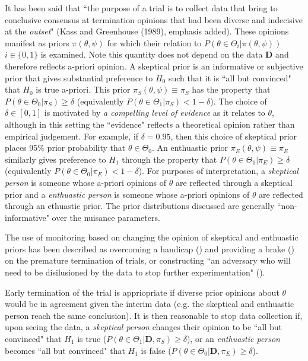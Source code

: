 \documentclass[12pt]{article}
\begin{document}
It has been said that ``the purpose of a trial is to collect data that bring to conclusive consensus at termination opinions that had been diverse and indecisive at the \textit{outset}" (Kass and Greenhouse (1989), emphasis added). These opinions manifest as priors $\pi(\theta,\psi)$ for which their relation to $P(\theta\in\Theta_i|\pi(\theta,\psi))$ $i\in\{0,1\}$ is examined. Note this quantity does not depend on the data $\mathbf{D}$ and therefore reflects a-priori opinion. A skeptical prior is an informative or subjective prior that gives substantial preference to $H_0$ such that it is ``all but convinced" that $H_0$ is true a-priori. This prior $\pi_{S}(\theta,\psi)\equiv\pi_{S}$ has the property that $P(\theta\in\Theta_0| \pi_{S})\geq\delta$ (equivalently $P(\theta\in\Theta_1| \pi_{S})<1-\delta$). The choice of $\delta\in[0,1]$ is motivated by \textit{a compelling level of evidence} as it relates to $\theta$, although in this setting the ``evidence" reflects a theoretical opinion rather than empirical judgement. For example, if $\delta=0.95$, then this choice of skeptical prior places 95\% prior probability that $\theta\in\Theta_0$. An enthuastic prior $\pi_{E}(\theta,\psi)\equiv\pi_{E}$ similarly gives preference to $H_1$ through the property that $P(\theta\in\Theta_1| \pi_{E})\geq\delta$ (equivalently $P(\theta\in\Theta_0| \pi_{E})<1-\delta$). For purposes of interpretation, a \textit{skeptical person} is someone whose a-priori opinions of $\theta$ are reflected through a skeptical prior and a \textit{enthuastic person} is someone whose a-priori opinions of $\theta$ are reflected through an ethuastic prior. The prior distributions discussed are generally ``non-informative" over the nuisance parameters.

The use of monitoring based on changing the opinion of skeptical and enthuastic priors has been described as overcoming a handicap (\cite{Freedman1989}) and providing a brake (\cite{Fayers1997}) on the premature termination of trials, or constructing ``an adversary who will need to be disilusioned by the data to stop further experimentation" (\cite{Spiegelhalter1994}). 

Early termination of the trial is appriopriate if diverse prior opinions about $\theta$ would be in agreement given the interim data (e.g. the skeptical and enthuastic person reach the same conclusion). It is then reasonable to stop data collection if, upon seeing the data, a \textit{skeptical person} changes their opinion to be ``all but convinced" that $H_1$ is true ($P(\theta\in\Theta_1|\mathbf{D}, \pi_{S})\geq\delta$), or an \textit{enthuastic person} becomes ``all but convinced" that $H_1$ is false ($P(\theta\in\Theta_0|\mathbf{D}, \pi_{E})\geq\delta$).
\end{document}
